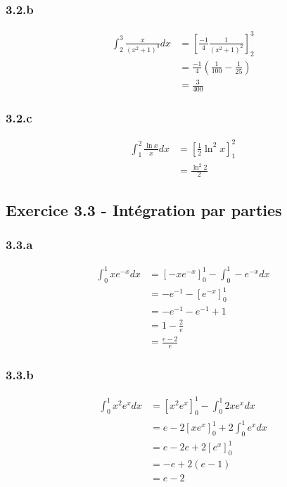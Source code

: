 \documentclass[a4paper,10pt]{report}
\begin{document}
\subsubsection*{3.2.b}
\begin{equation*}
	\begin{split}
		\int_2^3 \frac{x}{(x^2+1)^3}dx &= \left[ \frac{-1}{4}\frac{1}{(x^2+1)^2} \right]_2^3\\
		                               &= \frac{-1}{4} \left( \frac{1}{100} - \frac{1}{25} \right) \\
		                               &= \frac{3}{400}
	\end{split}
\end{equation*}

\subsubsection*{3.2.c}
\begin{equation*}
	\begin{split}
		\int_1^2 \frac{\ln x}{x}dx &= \left[\frac{1}{2}\ln^2 x \right]_1^2\\
		                           &= \frac{\ln^2 2}{2}
	\end{split}
\end{equation*}


\subsection*{Exercice 3.3 - Intégration par parties}
\subsubsection*{3.3.a}
\begin{equation*}
	\begin{split}
		\int_0^1 xe^{-x}dx &= \left[ -xe^{-x} \right]_0^1 - \int_0^1 -e^{-x}dx \\
		                   &= -e^{-1} - \left[ e^{-x} \right]_0^1 \\
		                   &= -e^{-1} - e^{-1} + 1 \\
		                   &= 1 - \frac{2}{e} \\
		                   &= \frac{e-2}{e}
	\end{split}
\end{equation*}

\subsubsection*{3.3.b}
\begin{equation*}
	\begin{split}
		\int_0^1 x^2e^xdx &= \left[ x^2 e^x \right]_0^1 - \int_0^1 2x e^x dx \\
		                  &= e - 2 \left[ x e^x \right]_0^1 + 2\int_0^1 e^x dx \\
		                  &= e -2e + 2 \left[ e^x \right]_0^1 \\
		                  &= -e + 2(e -1) \\
		                  & = e - 2
	\end{split}
\end{equation*}
\end{document}
